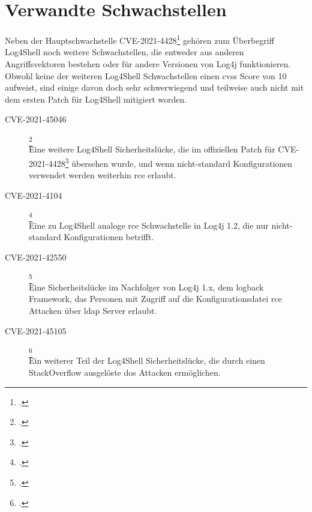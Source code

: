 
\section{Verwandte Schwachstellen}\label{sec:similarCVEs}
Neben der Hauptschwachstelle CVE-2021-4428\footcite{44228} gehören zum Überbegriff Log4Shell noch weitere Schwachstellen, die entweder aus anderen Angriffsvektoren bestehen oder für andere Versionen von Log4j funktionieren.
Obwohl keine der weiteren Log4Shell Schwachstellen einen \gls{cvss} Score von 10 aufweist, sind einige davon doch sehr schwerwiegend und teilweise auch nicht mit dem ersten Patch für Log4Shell mitigiert worden.

\begin{description}
    \item[CVE-2021-45046]\footcite{45046}\hfill \\Eine weitere Log4Shell Sicherheitslücke, die im offiziellen Patch für CVE-2021-4428\footcite{44228} übersehen wurde, und wenn nicht-standard Konfigurationen verwendet werden weiterhin \gls{rce} erlaubt.
    \item[CVE-2021-4104]\footcite{4104}\hfill \\Eine zu Log4Shell analoge \gls{rce} Schwachstelle in Log4j 1.2, die nur nicht-standard Konfigurationen betrifft.
    \item[CVE-2021-42550]\footcite{42550}\hfill \\Eine Sicherheitslücke im Nachfolger von Log4j 1.x, dem logback Framework, das Personen mit Zugriff auf die Konfigurationsdatei \gls{rce} Attacken über \gls{ldap} Server erlaubt.
    \item[CVE-2021-45105]\footcite{45105}\hfill \\Ein weiterer Teil der Log4Shell Sicherheitslücke, die durch einen StackOverflow ausgelöste \gls{dos} Attacken ermöglichen.
\end{description}
